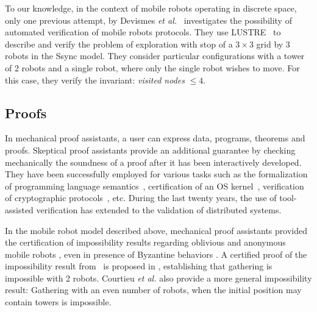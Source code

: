 To our knowledge, in the context of mobile robots operating in discrete space, only one previous attempt, by Devismes \emph{et
  al.}~\cite{devismes_optimal_2011} investigates the possibility of automated verification of mobile robots protocols. They use LUSTRE~\cite{lustre:ieee} to describe and verify the problem of exploration with stop of a $3\times 3$ grid by $3$ robots in the Ssync model.
 They consider particular configurations with a tower of 2 robots and a single robot, where only the single robot wishes to move. 
 For this case, they verify the invariant:  \emph{visited nodes} $\leq 4$. 
	
		\subsection{Proofs}


In mechanical proof assistants, a user can express data, programs, theorems and proofs. Skeptical proof assistants provide an additional guarantee by checking mechanically the soundness of a proof after it has been interactively developed.
They have been successfully employed for various tasks such as the formalization of programming language semantics~\cite{Leroy09}, certification of an OS kernel~\cite{KleinAEHCDEEKNSTW10}, verification of cryptographic protocols~\cite{AlmeidaBBBKB12}, etc.
During the last twenty years, the use of tool-assisted verification has extended to the validation of distributed systems.  


In the mobile robot model described above, mechanical proof assistants provided the certification of impossibility results regarding oblivious and anonymous mobile robots \cite{CourtieuRTU15}, even in presence of Byzantine behaviors \cite{AugerBCTU13}. A certified proof of the impossibility result from~\cite{suzuki_distributed_1999} is proposed in \cite{CourtieuRTU15}, establishing that gathering is impossible with 2 robots. Courtieu \textit{et al.} also provide a more general impossibility result: Gathering with an even number of robots, when the initial position may contain towers is impossible.
		
